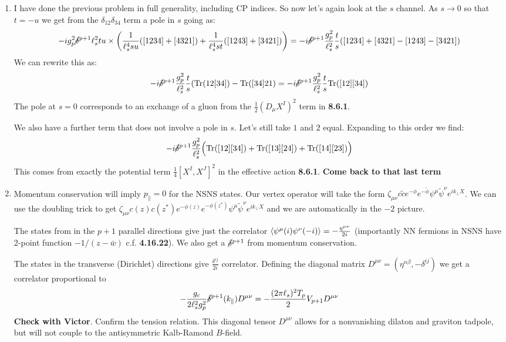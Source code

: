 \documentclass[11pt, class=article, crop=false]{standalone}
\begin{document}
\begin{enumerate}
	
	\item I have done the previous problem in full generality, including CP indices. So now let's again look at the $s$ channel. As $s \to 0$ so that $t = -u$ we get from the $\delta_{12} \delta_{34}$ term a pole in $s$ going as:
	\[
		- i g_p^2 \cancel\delta^{p+1} \ell_s^2 tu \times \left(\frac{1}{\ell_s^4 su} ([1234] + [4321]) + \frac{1}{\ell_s^4 st} ([1243] + [3421])\right) = -i \cancel\delta^{p+1} \frac{g_p^2}{\ell_s^2} \frac{t}{s} ([1234] + [4321] - [1243] - [3421])
	\]
	We can rewrite this as:
	\[
		-i \cancel\delta^{p+1} \frac{g_p^2}{\ell_s^2} \frac{t}{s} (\mathrm{Tr}(12[34]) - \mathrm{Tr}([34]21) = -i \cancel\delta^{p+1} \frac{g_p^2}{\ell_s^2} \frac{t}{s} \mathrm{Tr} ([12] [34])
	\]
	The pole at $s = 0$ corresponds to an exchange of a gluon from the $\frac12 (D_\mu X^I)^2$ term in \textbf{8.6.1}.
	
	We also have a further term that does not involve a pole in $s$. Let's still take $1$ and $2$ equal. Expanding to this order we find:
	\[
		-i \cancel\delta^{p+1} \frac{g_p^2}{\ell_s^2} \Big( \mathrm{Tr}([12][34])  + \mathrm{Tr}([13][24]) + \mathrm{Tr}([14][23]) \Big) 
	\]
	This comes from exactly the potential term $\frac14 [X^I, X^J]^2$ in the effective action \textbf{8.6.1}. \textbf{Come back to that last term}
	
	\item Momentum conservation will imply $p_{\parallel} = 0$ for the NSNS states. Our vertex operator will take the form $\zeta_{\mu \nu} c \tilde c e^{-\phi} e^{- \tilde \phi} \psi^\mu \tilde \psi^\nu e^{i k_{\perp} X}$. We can use the doubling trick to get $\zeta_{\mu \nu} c(z) c(z^*) e^{-\phi(z)} e^{-\phi(z^*)} \psi^\mu \tilde \psi^\nu e^{i k_{\perp} X}$ and we are automatically in the $-2$ picture. 
	
	The states from in the $p+1$ parallel directions give just the correlator $\braket{\psi^\mu(i) \psi^\nu(-i)} = -\frac{\eta^{\mu \nu}}{2i}$ (importantly NN fermions in NSNS have 2-point function $-1/(z-\bar w)$ c.f. \textbf{4.16.22}). We also get a $\cancel\delta^{p+1}$ from momentum conservation.
	
	The states in the transverse (Dirichlet) directions give $\frac{\delta^{ij}}{2i}$ correlator. Defining the diagonal matrix $D^{\mu \nu} = (\eta^{\alpha \beta}, -\delta^{ij})$ we get a correlator proportional to 
	\[
		-\frac{g_c}{2 \ell_s^2 g_p^2}\cancel\delta^{p+1}(k_{\parallel})  D^{\mu \nu}  = - \frac{(2 \pi \ell_s)^2 T_p}{2} V_{p+1} D^{\mu \nu}
	\]
	\textbf{Check with Victor}. Confirm the tension relation. This diagonal tensor $D^{\mu \nu}$ allows for a nonvanishing dilaton and graviton tadpole, but will not couple to the antisymmetric Kalb-Ramond $B$-field. 
	

\end{enumerate}
\end{document}
